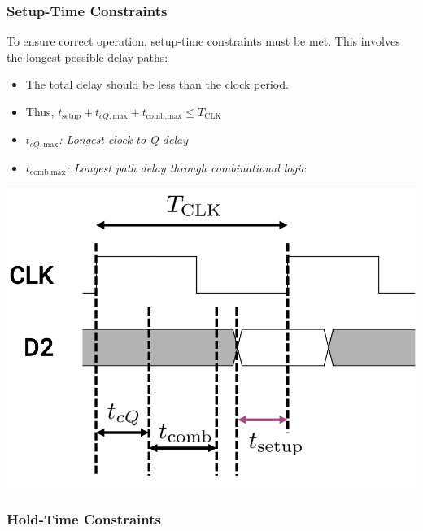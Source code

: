 \documentclass[12pt,openany]{book}
\begin{document}
\subsubsection{Setup-Time Constraints}
\begin{center}
    \begin{minipage}{0.5\textwidth}
        To ensure correct operation, setup-time constraints must be met. This involves the longest possible delay paths:
        \begin{itemize}
            \item[] The total delay should be less than the clock period.
            \item[] Thus, \( t_{\text{setup}} + t_{cQ,\text{max}} + t_{\text{comb,max}} \leq T_{\text{CLK}} \)
            \item[] \( t_{cQ,\text{max}} \)\textit{: Longest clock-to-Q delay}
            \item[] \( t_{\text{comb,max}} \)\textit{: Longest path delay through combinational logic}
        \end{itemize}
    \end{minipage}
    \hfill
    \begin{minipage}{0.4\textwidth}
        \includegraphics[width=1\textwidth]{circuits/15.1.2_2.png}
    \end{minipage}
\end{center}

\subsubsection{Hold-Time Constraints}
\end{document}
